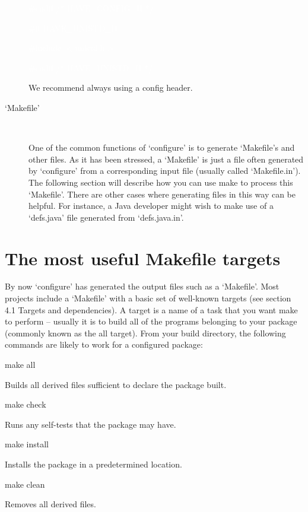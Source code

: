 \begin{description}
{\begin{minipage}{12cm}
  \textcolor{white}{\#endif /* HAVE\_{}CONFIG\_{}H */}

  \textcolor{white}{\#if HAVE\_{}UNISTD\_{}H}

  \textcolor{white}{\#include $<$unistd.h$>$}

  \textcolor{white}{\#endif /* HAVE\_{}UNISTD\_{}H */}

\end{minipage}}
\bigskip

We recommend always using a config header. 


\item[`Makefile']
\ %

One of the common functions of `configure' is to generate `Makefile's and other files. As it has been stressed, a `Makefile' is just a file often generated by `configure' from a corresponding input file (usually called `Makefile.in'). The following section will describe how you can use make to process this `Makefile'. There are other cases where generating files in this way can be helpful. For instance, a Java developer might wish to make use of a `defs.java' file generated from `defs.java.in'. 
\end{description} 

\section{The most useful Makefile targets}


By now `configure' has generated the output files such as a `Makefile'. Most projects include a `Makefile' with a basic set of well-known targets (see section 4.1 Targets and dependencies). A target is a name of a task that you want make to perform -- usually it is to build all of the programs belonging to your package (commonly known as the all target). From your build directory, the following commands are likely to work for a configured package:

\bigskip
\noindent
make all

Builds all derived files sufficient to declare the package built. 

\noindent
make check 

Runs any self-tests that the package may have. 

\noindent
make install 

Installs the package in a predetermined location. 

\noindent
make clean 

Removes all derived files. 

